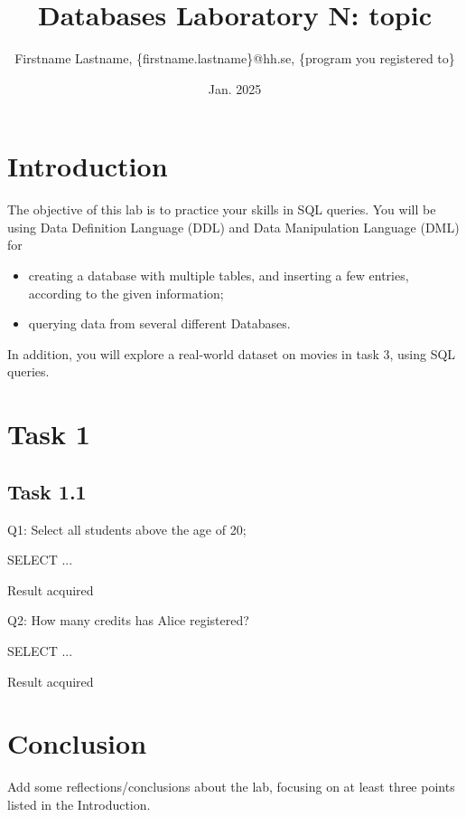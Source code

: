 \documentclass{article}
\title{Databases Laboratory N: topic}
\author{Firstname Lastname,  \{firstname.lastname\}@hh.se, \{program you registered to\}}
\date{Jan. 2025}
\begin{document}
\maketitle

\section{Introduction}

The objective of this lab is to practice your skills in SQL queries. You will be using Data Definition Language (DDL) and Data Manipulation Language (DML) for

\begin{itemize}

\item creating a database with multiple tables, and inserting a few entries, according to the given information;

\item querying data from several different Databases.

\end{itemize}

In addition, you will explore a real-world dataset on movies in task 3, using SQL queries.

\section{Task 1}

\subsection{Task 1.1}

Q1: Select all students above the age of 20;

\begin{tcolorbox}
SELECT ...
\end{tcolorbox}

\begin{tcolorbox}
Result acquired
\end{tcolorbox}


Q2: How many credits has Alice registered?

\begin{tcolorbox}
SELECT ...
\end{tcolorbox}

\begin{tcolorbox}
Result acquired
\end{tcolorbox}


\section{Conclusion}

Add some reflections/conclusions about the lab, focusing on at least three points listed in the Introduction.
\end{document}
